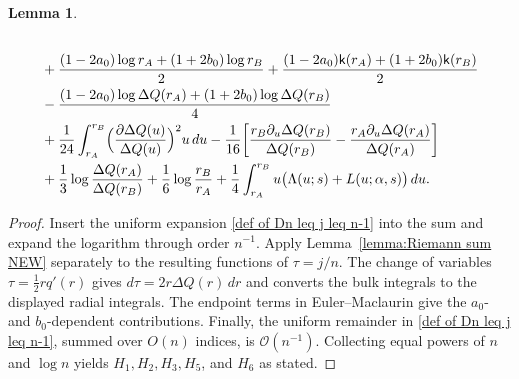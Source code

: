 \documentclass[a4paper]{article}
\newtheorem{lemma}[theorem]{Lemma}
\numberwithin{equation}{section}
\begin{document}
\begin{lemma}
\begin{align}
\begin{split}
\\
&\quad
+\frac{(1-2a_0)\log r_{A}+(1+2b_0)\log r_{B}}{2}
+\frac{(1-2a_0)\mathsf{k}(r_{A})+(1+2b_0)\mathsf{k}(r_{B})}{2}
\\
&\quad
-\frac{(1-2a_0)\log\Delta Q(r_{A})+(1+2b_0)\log\Delta Q(r_{B})}{4}
\\
&\quad
+\frac{1}{24}\int_{r_{A}}^{r_{B}}\Bigl(\frac{\partial \Delta Q(u)}{\Delta Q(u)}\Bigr)^2u\,du-\frac{1}{16}\bigg[
\frac{r_{B}\partial_u\Delta Q(r_{B})}{\Delta Q(r_{B})}-\frac{r_{A}\partial_u\Delta Q(r_{A})}{\Delta Q(r_{A})}
\bigg]\\
&\quad +\frac{1}{3}\log\frac{\Delta Q(r_{A})}{\Delta Q(r_{B})}+\frac{1}{6}\log\frac{r_{B}}{r_{A}}+\frac{1}{4}\int_{r_{A}}^{r_{B}}u\bigl( \Lambda(u;s)+L(u;\alpha,s)\bigr)\,du.
\end{split} 
\end{align}
\end{lemma}

\begin{proof}
Insert the uniform expansion \eqref{def of Dn leq j leq n-1} into the sum and expand the logarithm through order $n^{-1}$. Apply Lemma~\ref{lemma:Riemann sum NEW} separately to the resulting functions of $\tau=j/n$. The change of variables $\tau=\frac12 r q'(r)$ gives $d\tau=2r\Delta Q(r)\,dr$ and converts the bulk integrals to the displayed radial integrals. The endpoint terms in Euler--Maclaurin give the $a_0$- and $b_0$-dependent contributions. Finally, the uniform remainder in \eqref{def of Dn leq j leq n-1}, summed over $O(n)$ indices, is $\mathcal O(n^{-1})$. Collecting equal powers of $n$ and $\log n$ yields $H_1,H_2,H_3,H_5$, and $H_6$ as stated.
\end{proof}

\end{document}
